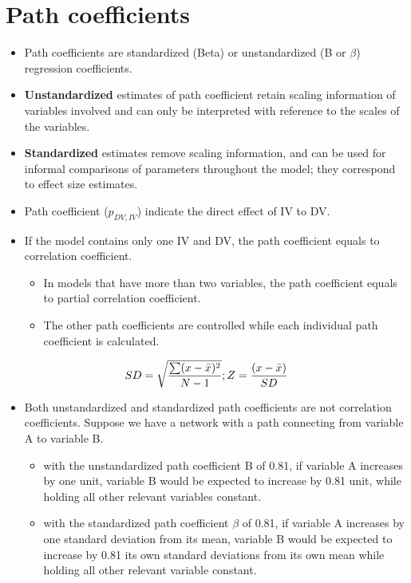 \documentclass[11pt,dvipsnames,ignorenonframetext,aspectratio=169]{beamer}
\providecommand{\tightlist}{%
  \setlength{\itemsep}{0pt}\setlength{\parskip}{0pt}}
\begin{document}
\hypertarget{path-coefficients}{%
\section{Path coefficients}\label{path-coefficients}}

\begin{frame}{}
\protect\hypertarget{section-3}{}
\begin{itemize}
\tightlist
\item
  Path coefficients are standardized (Beta) or unstandardized (B or
  \(\beta\)) regression coefficients.
\item
  \textbf{Unstandardized} estimates of path coefficient retain scaling
  information of variables involved and can only be interpreted with
  reference to the scales of the variables.
\item
  \textbf{Standardized} estimates remove scaling information, and can be
  used for informal comparisons of parameters throughout the model; they
  correspond to effect size estimates.
\item
  Path coefficient (\(p_{DV,IV}\)) indicate the direct effect of IV to
  DV.
\item
  If the model contains only one IV and DV, the path coefficient equals
  to correlation coefficient.

  \begin{itemize}
  \tightlist
  \item
    In models that have more than two variables, the path coefficient
    equals to partial correlation coefficient.
  \item
    The other path coefficients are controlled while each individual
    path coefficient is calculated.
  \end{itemize}
\end{itemize}

\[SD = \large \sqrt{\frac{\sum (x-\bar{x})^2}{N-1}}; \large Z = \frac{(x - \bar{x})}{SD}\]
\end{frame}

\begin{frame}{}
\protect\hypertarget{section-4}{}
\begin{itemize}
\tightlist
\item
  Both unstandardized and standardized path coefficients are not
  correlation coefficients. Suppose we have a network with a path
  connecting from variable A to variable B.

  \begin{itemize}
  \tightlist
  \item
    with the unstandardized path coefficient B of 0.81, if variable A
    increases by one unit, variable B would be expected to increase by
    0.81 unit, while holding all other relevant variables constant.
  \item
    with the standardized path coefficient \(\beta\) of 0.81, if
    variable A increases by one standard deviation from its mean,
    variable B would be expected to increase by 0.81 its own standard
    deviations from its own mean while holding all other relevant
    variable constant.
  \end{itemize}
\end{itemize}
\end{frame}
\end{document}
